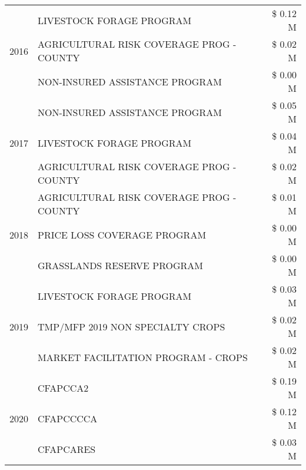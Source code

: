 \begin{tabular}{llr}
\cline{1-3}
\multirow[t]{3}{*}{2016} & LIVESTOCK FORAGE PROGRAM                      & \$ 0.12 M \\
 & AGRICULTURAL RISK COVERAGE PROG - COUNTY      & \$ 0.02 M \\
 & NON-INSURED ASSISTANCE PROGRAM                & \$ 0.00 M \\
\cline{1-3}
\multirow[t]{3}{*}{2017} & NON-INSURED ASSISTANCE PROGRAM & \$ 0.05 M \\
 & LIVESTOCK FORAGE PROGRAM & \$ 0.04 M \\
 & AGRICULTURAL RISK COVERAGE PROG - COUNTY & \$ 0.02 M \\
\cline{1-3}
\multirow[t]{3}{*}{2018} & AGRICULTURAL RISK COVERAGE PROG - COUNTY & \$ 0.01 M \\
 & PRICE LOSS COVERAGE PROGRAM & \$ 0.00 M \\
 & GRASSLANDS RESERVE PROGRAM & \$ 0.00 M \\
\cline{1-3}
\multirow[t]{3}{*}{2019} & LIVESTOCK FORAGE PROGRAM & \$ 0.03 M \\
 & TMP/MFP 2019 NON SPECIALTY CROPS & \$ 0.02 M \\
 & MARKET FACILITATION PROGRAM - CROPS & \$ 0.02 M \\
\cline{1-3}
\multirow[t]{3}{*}{2020} & CFAPCCA2 & \$ 0.19 M \\
 & CFAPCCCCA & \$ 0.12 M \\
 & CFAPCARES & \$ 0.03 M \\
\cline{1-3}
\bottomrule
\end{tabular}
